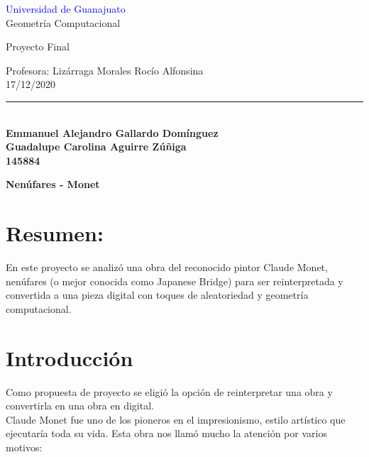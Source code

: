 \documentclass[11pt,a4paper]{article}
\begin{document}
\begin{center}

\textcolor{blue}{Universidad de Guanajuato}\\
Geometría Computacional\\
\begin{large}
Proyecto Final\\

\end{large}
Profesora: Lizárraga Morales Rocío Alfonsina\\
17/12/2020\\
\rule{70mm}{.1mm}\\
\bf{Emmanuel Alejandro Gallardo Domínguez}\\
\bf{Guadalupe Carolina Aguirre Zúñiga}\\
145884\\

\end{center}


\begin{center}

\bf{{\huge Nenúfares - Monet}}
\end{center}

\section{Resumen:}
En este proyecto se analizó una obra del reconocido pintor Claude Monet, nenúfares (o mejor conocida como Japanese Bridge) para ser reinterpretada y convertida a una pieza digital con toques de aleatoriedad y geometría computacional.
\section{Introducción}
	Como propuesta de proyecto se eligió la opción de reinterpretar una obra y convertirla en una obra en digital.\\
	Claude Monet fue uno de los pioneros en el impresionismo, estilo artístico que ejecutaría toda su vida. Esta obra nos llamó mucho la atención por varios motivos:	
	
\end{document}
